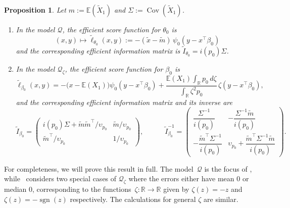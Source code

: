 \documentclass[a4paper]{article}
\newcommand{\R}{\mathbb{R}}
\newcommand{\E}{\mathbb{E}}
\DeclareMathOperator\Cov{Cov}
\DeclareMathOperator{\sgn}{sgn}
\newtheorem{proposition}[theorem]{Proposition}
\theoremstyle{definition}
\begin{document}
\begin{proposition}
\label{prop:linreg-semiparametric}
Let $m := \E(\tilde{X}_1)$ and $\Sigma := \Cov(\tilde{X}_1)$.
\begin{enumerate}[label=(\alph*)]
\item In the model $\mathcal{Q}$, the efficient score function for $\theta_0$ is
\begin{equation}
\label{eq:efficient-score-theta}
(x,y) \mapsto \tilde{\ell}_{\theta_0}(x,y) := -(\tilde{x} - \tilde{m})\,\psi_0(y - x^\top\beta_0)
\end{equation}
and the corresponding efficient information matrix is $\tilde{I}_{\theta_0} = i(p_0)\Sigma$.
\item In the model $\mathcal{Q}_\zeta$, the efficient score function for $\beta_0$ is
\begin{equation}
\label{eq:efficient-score-beta}
\tilde{\ell}_{\beta_0}(x,y) = -\bigl(x - \E(X_1)\bigr)\psi_0(y - x^\top\beta_0) + \frac{\E(X_1)\int_\R p_0\,d\zeta}{\int_\R \zeta^2 p_0}\,\zeta(y - x^\top\beta_0),
\end{equation}
and the corresponding efficient information matrix and its inverse are
\begin{equation}
\label{eq:efficient-information-beta}
\tilde{I}_{\beta_0} =
\begin{pmatrix}
i(p_0)\Sigma + \tilde{m}\tilde{m}^\top/\upsilon_{p_0} & \tilde{m}/\upsilon_{p_0} \\[3pt]
\tilde{m}^\top/\upsilon_{p_0} & 1/\upsilon_{p_0}
\end{pmatrix},
\qquad\quad
\tilde{I}_{\beta_0}^{-1} =
\begin{pmatrix}
\dfrac{\Sigma^{-1}}{i(p_0)} & -\dfrac{\Sigma^{-1}\tilde{m}}{i(p_0)} \\[10pt]
-\dfrac{\tilde{m}^\top\Sigma^{-1}}{i(p_0)} & \upsilon_{p_0} + \dfrac{\tilde{m}^\top\Sigma^{-1}\tilde{m}}{i(p_0)}
\end{pmatrix}.
\end{equation}
\end{enumerate}
\end{proposition}

For completeness, we will prove this result in full. The model~$\mathcal{Q}$ is the focus of \citet[Example~3]{bickel1982adaptive}, while~\citet[Section~4.1]{kosorok2008introduction} considers two special cases of $\mathcal{Q}_\zeta$ where the errors either have mean 0 or median 0, corresponding to the functions~$\zeta \colon \R \to \R$ given by $\zeta(z) = -z$ and $\zeta(z) = -\sgn(z)$ respectively. The calculations for general $\zeta$ are similar.
\end{document}
